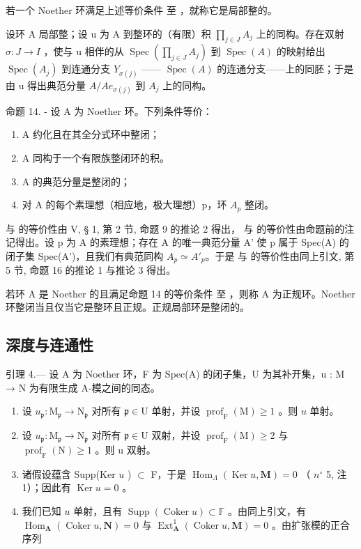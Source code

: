 若一个 Noether 环满足上述等价条件 至 ，就称它是局部整的。

设环 A 局部整；设 u 为 A 到整环的（有限）积 \(\prod_{j\in J}A_{j}\) 上的同构。存在双射 \(\sigma:J\to I\) ，使与 u 相伴的从 \(\operatorname{Spec}(\prod_{j\in J}A_{j})\) 到 \(\operatorname{Spec}(A)\) 的映射给出 \(\operatorname{Spec}(A_{j})\) 到连通分支 \(Y_{\sigma(j)}\) —— \(\operatorname{Spec}(A)\) 的连通分支——上的同胚；于是由 u 得出典范分量 \(A/Ae_{\sigma(j)}\) 到 \(A_{j}\) 上的同构。

命题 14. - 设 A 为 Noether 环。下列条件等价：

\begin{enumerate}
\def\labelenumi{(\roman{enumi})}
\item
  A 约化且在其全分式环中整闭；
\item
  A 同构于一个有限族整闭环的积。
\item
  A 的典范分量是整闭的；
\item
  对 A 的每个素理想（相应地，极大理想）p，环 \(A_{p}\) 整闭。
\end{enumerate}

 与 的等价性由 V, § 1, 第 2 节, 命题 9 的推论 2 得出， 与 的等价性由命题前的注记得出。设 p 为 A 的素理想；存在 A 的唯一典范分量 A' 使 p 属于 Spec(A) 的闭子集 Spec(A')，且我们有典范同构 \(A_{p} \simeq A'_{p}\)。于是 与 的等价性由同上引文, 第 5 节, 命题 16 的推论 1 与推论 3 得出。

若环 A 是 Noether 的且满足命题 14 的等价条件 至 ，则称 A 为正规环。Noether 环整闭当且仅当它是整环且正规。正规局部环是整闭的。

\subsection{深度与连通性}

引理 4.--- 设 A 为 Noether 环，F 为 Spec(A) 的闭子集，U 为其补开集，u : M → N 为有限生成 A-模之间的同态。

\begin{enumerate}
\def\labelenumi{\alph{enumi})}
\item
  设 \(u_{\mathfrak{p}}: \mathrm{M}_{\mathfrak{p}} \to \mathrm{N}_{\mathfrak{p}}\) 对所有 \(\mathfrak{p} \in \mathrm{U}\) 单射，并设 \(\operatorname{prof}_{\mathrm{F}}(\mathrm{M}) \geqslant 1\) 。则 \(u\) 单射。
\item
  设 \(u_{\mathfrak{p}}: \mathrm{M}_{\mathfrak{p}} \to \mathrm{N}_{\mathfrak{p}}\) 对所有 \(\mathfrak{p} \in \mathrm{U}\) 双射，并设 \(\operatorname{prof}_{\mathrm{F}}(\mathrm{M}) \geqslant 2\) 与 \(\operatorname{prof}_{\mathrm{F}}(\mathrm{N}) \geqslant 1\) 。则 u 双射。
\item
  诸假设蕴含 Supp(Ker \(u\) ) \(\subset\) F，于是 \(\operatorname{Hom}_{\Lambda}(\operatorname{Ker} u, \mathbf{M}) = 0\) （ \(n^{\circ}\) 5, 注 1）；因此有 \(\operatorname{Ker} u = 0\) 。
\item
  我们已知 \(u\) 单射，且有 \(\operatorname{Supp}(\operatorname{Coker} u) \subset \mathbb{F}\) 。由同上引文，有 \(\operatorname{Hom}_{\mathbf{A}}(\operatorname{Coker} u, \mathbf{N}) = 0\) 与 \(\operatorname{Ext}_{\mathbf{A}}^{1}(\operatorname{Coker} u, \mathbf{M}) = 0\) 。由扩张模的正合序列
\end{enumerate}

